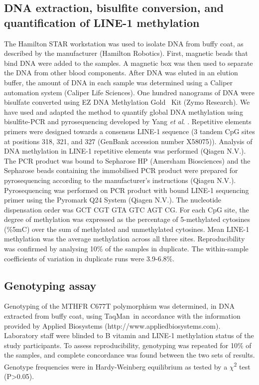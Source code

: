 \subsection{DNA extraction, bisulfite conversion, and quantification of LINE-1 methylation} %
\noindent The Hamilton STAR workstation was used to isolate DNA from buffy coat, as described by the manufacturer (Hamilton Robotics). First, magnetic beads that bind DNA were added to the samples. A magnetic box was then used to separate the DNA from other blood components. After DNA was eluted in an elution buffer, the amount of DNA in each sample was determined using a Caliper automation system (Caliper Life Sciences). One hundred nanograms of DNA were bisulfate converted using EZ DNA Methylation Gold\texttrademark~ Kit (Zymo Research). We have used and adapted the method to quantify global DNA methylation using bisulfite-PCR and pyrosequencing developed by Yang \emph{et al}. \cite{c328}. Repetitive elements primers were designed towards a consensus LINE-1 sequence (3 tandem CpG sites at positions 318, 321, and 327 (GenBank accession number X58075)). Analysis of DNA methylation in LINE-1 repetitive elements was performed (Qiagen N.V.). The PCR product was bound to Sepharose HP (Amersham Biosciences) and the Sepharose beads containing the immobilised PCR product were prepared for pyrosequencing according to the manufacturer's instructions (Qiagen N.V.). Pyrosequencing was performed on PCR product with bound LINE-1 sequencing primer using the Pyromark Q24 System (Qiagen N.V.). The nucleotide dispensation order was GCT CGT GTA GTC AGT CG. For each CpG site, the degree of methylation was expressed as the percentage of 5-methylated cytosines (\%5mC) over the sum of methylated and unmethylated cytosines. Mean LINE-1 methylation was the average methylation across all three sites. Reproducibility was confirmed by analysing 10\% of the samples in duplicate. The within-sample coefficients of variation in duplicate runs were 3.9-6.8\%.

\subsection{Genotyping assay} %
\noindent Genotyping of the MTHFR C677T polymorphism was determined, in DNA extracted from buffy coat, using TaqMan\textregistered~in accordance with the information provided by Applied Biosystems (http://www.appliedbiosystems.com). Laboratory staff were blinded to B vitamin and LINE-1 methylation status of the study participants. To assess reproducibility, genotyping was repeated for 10\% of the samples, and complete concordance was found between the two sets of results. Genotype frequencies were in Hardy-Weinberg equilibrium as tested by a $\chi$\textsuperscript{2} test (P>0.05).

